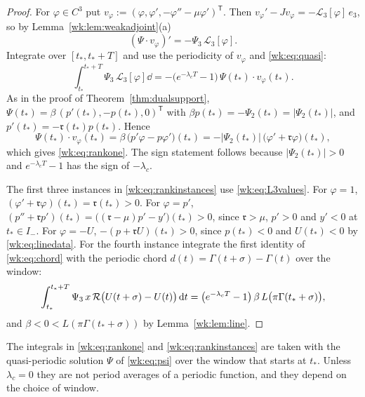 \begin{proof}
For $\varphi\in C^3$ put $v_\varphi:=(\varphi,\varphi',-\varphi''-\mu\varphi')^{\mathsf T}$. Then $v_\varphi'-Jv_\varphi=-\mathcal L_3[\varphi]\,e_3$, so by Lemma~\ref{wk:lem:weakadjoint}(a)
\[
(\Psi\cdot v_\varphi)'=-\Psi_3\,\mathcal L_3[\varphi].
\]
Integrate over $[t_\ast,t_\ast+T]$ and use the periodicity of $v_\varphi$ and \eqref{wk:eq:quasi}:
\[
\int_{t_\ast}^{t_\ast+T}\Psi_3\,\mathcal L_3[\varphi]\dd=-\bigl(e^{-\lambda_cT}-1\bigr)\,\Psi(t_\ast)\cdot v_\varphi(t_\ast).
\]
As in the proof of Theorem~\ref{thm:dualsupport}, $\Psi(t_\ast)=\beta\,(p'(t_\ast),-p(t_\ast),0)^{\mathsf T}$ with $\beta p(t_\ast)=-\Psi_2(t_\ast)=|\Psi_2(t_\ast)|$, and $p'(t_\ast)=-\mathfrak r(t_\ast)p(t_\ast)$. Hence
\[
\Psi(t_\ast)\cdot v_\varphi(t_\ast)=\beta\,\bigl(p'\varphi-p\varphi'\bigr)(t_\ast)=-\bigl|\Psi_2(t_\ast)\bigr|\,\bigl(\varphi'+\mathfrak r\varphi\bigr)(t_\ast),
\]
which gives \eqref{wk:eq:rankone}. The sign statement follows because $|\Psi_2(t_\ast)|>0$ and $e^{-\lambda_cT}-1$ has the sign of $-\lambda_c$.

The first three instances in \eqref{wk:eq:rankinstances} use \eqref{wk:eq:L3values}. For $\varphi=1$, $(\varphi'+\mathfrak r\varphi)(t_\ast)=\mathfrak r(t_\ast)>0$. For $\varphi=p'$, $(p''+\mathfrak rp')(t_\ast)=\bigl((\mathfrak r-\mu)p'-y'\bigr)(t_\ast)>0$, since $\mathfrak r>\mu$, $p'>0$ and $y'<0$ at $t_\ast\in I_-$. For $\varphi=-U$, $-(p+\mathfrak rU)(t_\ast)>0$, since $p(t_\ast)<0$ and $U(t_\ast)<0$ by \eqref{wk:eq:linedata}. For the fourth instance integrate the first identity of \eqref{wk:eq:chord} with the periodic chord $d(t)=\Gamma(t+\sigma)-\Gamma(t)$ over the window:
\[
\int_{t_\ast}^{t_\ast+T}\Psi_3\,x\,\mathcal R\bigl(U(t+\sigma)-U(t)\bigr)\,\mathrm dt=\bigl(e^{-\lambda_cT}-1\bigr)\,\beta\,L\bigl(\pi\Gamma(t_\ast+\sigma)\bigr),
\]
and $\beta<0<L(\pi\Gamma(t_\ast+\sigma))$ by Lemma~\ref{wk:lem:line}.
\end{proof}
The integrals in \eqref{wk:eq:rankone} and \eqref{wk:eq:rankinstances} are taken with the quasi-periodic solution $\Psi$ of \eqref{wk:eq:psi} over the window that starts at $t_\ast$. Unless $\lambda_c=0$ they are not period averages of a periodic function, and they depend on the choice of window.

